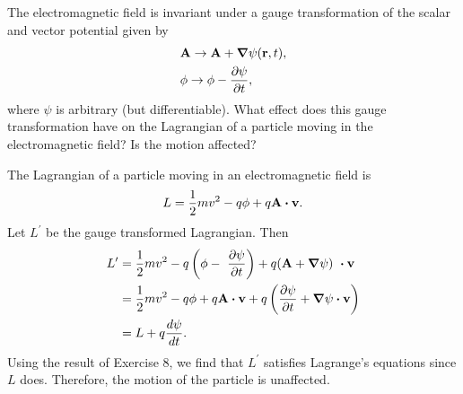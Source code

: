 \begin{questions}
\question The electromagnetic field is invariant under a gauge transformation of the scalar and vector potential given by
\begin{align*}
&\bm{\mathbf{A}} \rightarrow \bm{\mathbf{A}} + \boldsymbol{\nabla} \psi ( \bm{\mathbf{r}}, t ), \\
&\phi \rightarrow \phi - \frac{\partial \psi}{\partial t},
\end{align*}
where $\psi$ is arbitrary (but differentiable). What effect does this gauge transformation have on the Lagrangian of a particle moving in the electromagnetic field? Is the motion affected?
\begin{solution}
The Lagrangian of a particle moving in an electromagnetic field is
\[
L = \frac{1}{2} m v^2 - q \phi + q \bm{\mathbf{A}} \boldsymbol{\cdot} \bm{\mathbf{v}}.
\]
Let $L^\prime$ be the gauge transformed Lagrangian. Then
\begin{align*}
L^\prime &= \frac{1}{2} m v^2 - q \left( \phi - \frac{\partial \psi}{\partial t} \right) + q ( \vec{A} + \del \psi ) \bfcdot \vec{v} \\
&= \frac{1}{2} m v^2 - q \phi + q \vec{A} \bfcdot \vec{v} + q \left( \frac{\partial \psi}{\partial t} + \del \psi \bfcdot \vec{v} \right) \\
&= L + q \frac{d \psi}{dt}.
\end{align*}
Using the result of Exercise 8, we find that $L^\prime$ satisfies Lagrange's equations since $L$ does. Therefore, the motion of the particle is unaffected.
\end{solution}


\end{questions}
